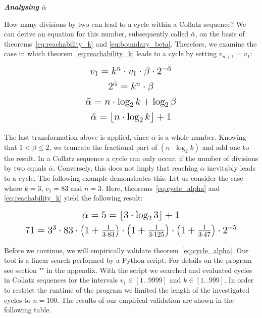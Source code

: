 \documentclass{SciPress_2015}
\renewcommand{\large}{\fontsize{14}{18pt}\selectfont}
\renewcommand{\subsection}[1]{\textit{\textbf{#1}}}
\begin{document}
\vspace{1em}\noindent
\subsection{Analysing \boldmath$\bar\alpha$}
\par\noindent
How many divisions by two can lead to a cycle within a Collatz sequence? We can derive an equation for this number, subsequently called $\bar\alpha$, on the basis of theorems~\ref{eq:reachability_k} and \ref{eq:boundary_beta}. Therefore, we examine the case in which theorem~\ref{eq:reachability_k} leads to a cycle by setting  $v_{n+1}=v_1$:
\begin{equation}
\label{eq:cycle_alpha}
\large\def\arraystretch{1.2}\begin{array}{c}
	v_1=k^n\cdot v_1\cdot\beta\cdot2^{-\bar\alpha}\\
	2^{\bar\alpha}=k^n\cdot\beta\\
	\bar\alpha=n\cdot \log_2k + \log_2\beta\\
	\bar\alpha=\lfloor n\cdot\log_2k\rfloor+1
\end{array}
\end{equation}

\par\medskip
The last transformation above is applied, since $\bar\alpha$ is a whole number. Knowing that $1<\beta\le2$, we truncate the fractional part of $(n\cdot \log_2k)$ and add one to the result. In a Collatz sequence a cycle can only occur, if the number of divisions by two equals $\bar\alpha$. Conversely, this does not imply that reaching $\bar\alpha$ inevitably leads to a cycle. The following example demonstrates this. Let us consider the case where $k=3$, $v_1=83$ and $n=3$. Here, theorems~\ref{eq:cycle_alpha} and \ref{eq:reachability_k} yield the following result:
\[
\large\def\arraystretch{1.2}\begin{array}{c}
\bar\alpha=5=\lfloor3\cdot\log_23\rfloor+1\\
71=3^3\cdot83\cdot\left(1+\frac{1}{3\cdot83}\right)\cdot\left(1+\frac{1}{3\cdot125}\right)\cdot\left(1+\frac{1}{3\cdot47}\right)\cdot2^{-5}
\end{array}
\]

\par\medskip
Before we continue, we will empirically validate theorem~\ref{eq:cycle_alpha}. Our tool is a linear search performed by a Python script. For details on the program see section "" in the appendix. With the script we searched and evaluated cycles in Collatz sequences for the intervals $v_1\in[1\mathrel{{.}\,{.}}9999]$ and $k\in[1\mathrel{{.}\,{.}}999]$. In order to restrict the runtime of the program we limited the length of the investigated cycles to $n=100$. The results of our empirical validation are shown in the following table.
\end{document}
